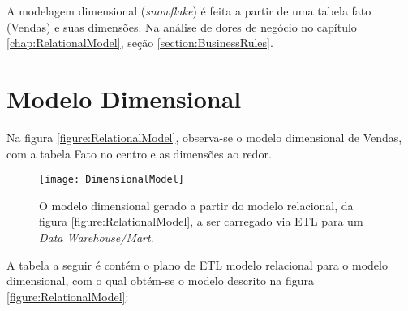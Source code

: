 \label{chap:DimensionalModel} 

A modelagem dimensional (\emph{snowflake}) é feita a partir de uma tabela fato (Vendas) e suas dimensões. Na análise de dores de negócio no capítulo \ref{chap:RelationalModel}, seção \ref{section:BusinessRules}.

\section{Modelo Dimensional}

Na figura \ref{figure:RelationalModel}, observa-se o modelo dimensional de Vendas, com a tabela Fato no centro e as dimensões ao redor.

\begin{center}
\begin{figure}[ht]
\begin{centering}
\texttt{[image: DimensionalModel]}
\par\end{centering}
  \caption{\label{figure:DimensionalModel}O modelo dimensional gerado a partir do modelo relacional, da figura \ref{figure:RelationalModel}, a ser carregado via ETL para um \emph{Data Warehouse/Mart}.}
\end{figure}
\vspace*{-40pt}
\par\end{center}

A tabela a seguir é contém o plano de ETL modelo relacional para o modelo dimensional, com o qual obtém-se o modelo descrito na figura \ref{figure:RelationalModel}:

